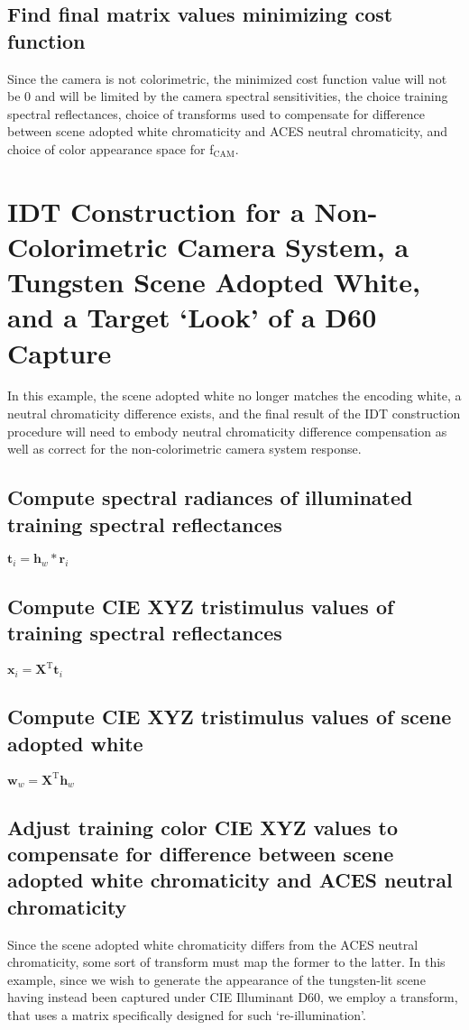 \subsection{Find final matrix values minimizing cost function}
Since the camera is not colorimetric, the minimized cost function value will not be 0 and will be limited by the camera spectral sensitivities, the choice training spectral reflectances, choice of transforms used to compensate for difference between scene adopted white chromaticity and ACES neutral chromaticity, and choice of color appearance space for f$_\mathrm{CAM}$.


\section{IDT Construction for a Non-Colorimetric Camera System, a Tungsten Scene Adopted White, and a Target `Look' of a D60 Capture}
\label{sec:a4}
In this example, the scene adopted white no longer matches the encoding white, a neutral chromaticity difference exists, and the final result of the IDT construction procedure will need to embody neutral chromaticity difference compensation as well as correct for the non-colorimetric camera system response.

\subsection{Compute spectral radiances of illuminated training spectral reflectances}
$\mathbf{t}_i=\mathbf{h}_w*\mathbf{r}_i$

\subsection{Compute CIE XYZ tristimulus values of training spectral reflectances}
$\mathbf{x}_i=\mathbf{X}^\mathrm{T}\mathbf{t}_i$

\subsection{Compute CIE XYZ tristimulus values of scene adopted white}
$\mathbf{w}_w=\mathbf{X}^\mathrm{T}\mathbf{h}_w$

\subsection{Adjust training color CIE XYZ values to compensate for difference between scene adopted white chromaticity and ACES neutral chromaticity}
Since the scene adopted white chromaticity differs from the ACES neutral chromaticity, some sort of transform must map the former to the latter. In this example, since we wish to generate the appearance of the tungsten-lit scene having instead been captured under CIE Illuminant D60, we employ a transform, that uses a matrix specifically designed for such ‘re-illumination’.

